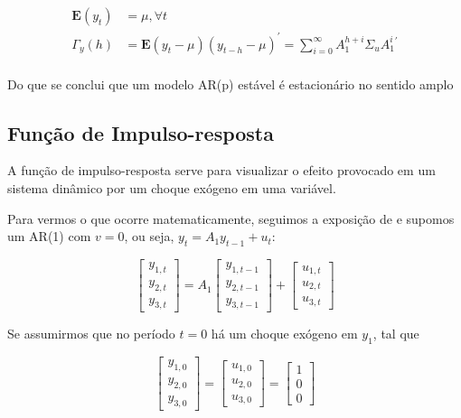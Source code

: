 \documentclass[a4paper,
               article,
               12pt,
               openany,
               oneside,
               english,
               brazil]{abntex2}
\numberwithin{equation}{section}
\begin{document}
    \begin{align*}
        \label{momentos}
        \mathbf{E}(y_t) &= \mu, \forall t \\
        \Gamma_y (h) &= \mathbf{E}(y_t - \mu)(y_{t-h} - \mu)^{'} = \sum_{i=0}^{\infty} A_1^{h+i} \Sigma_u A_1^{i}^{'} \\
    \end{align*}

    Do que se conclui que um modelo AR(p) estável é estacionário no sentido amplo \cite[p.~15-16]{lutkepool}

    \subsection{Função de Impulso-resposta}

    A função de impulso-resposta serve para visualizar o efeito provocado em um sistema dinâmico por um choque exógeno em uma variável.

    Para vermos o que ocorre matematicamente, seguimos a exposição de \textcite[p.~51-53]{lutkepool} e supomos um AR(1) com $ v = 0 $, ou seja, $ y_t = A_1 y_{t-1} + u_t $:

    \begin{equation*}
        \begin{bmatrix}
            y_{1,t} \\
            y_{2,t} \\
            y_{3,t}
        \end{bmatrix} =
        A_1
        \begin{bmatrix}
            y_{1,t-1} \\
            y_{2,t-1} \\
            y_{3,t-1}
        \end{bmatrix} +
        \begin{bmatrix}
            u_{1,t} \\
            u_{2,t} \\
            u_{3,t}
        \end{bmatrix}
    \end{equation*}

    Se assumirmos que no período $ t = 0 $ há um choque exógeno em $ y_1 $, tal que

    \begin{equation*}
        \begin{bmatrix}
            y_{1,0} \\
            y_{2,0} \\
            y_{3,0}
        \end{bmatrix} =
        \begin{bmatrix}
            u_{1,0} \\
            u_{2,0} \\
            u_{3,0}
        \end{bmatrix} =
        \begin{bmatrix}
            1 \\
            0 \\
            0
        \end{bmatrix}
    \end{equation*}
\end{document}
